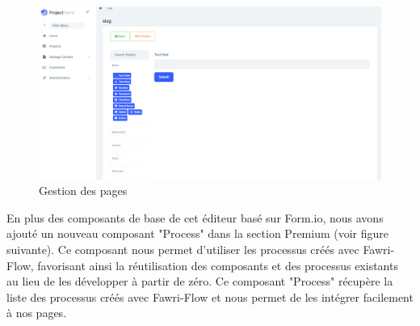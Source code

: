 \begin{enumerate}
\begin{figure}[H] 
    \centering
    \includegraphics[width=17cm]{Figures/manage page.PNG}
    \caption{Gestion des pages}
\end{figure}


En plus des composants de base de cet éditeur basé sur Form.io, nous avons ajouté un nouveau composant "Process" dans la section Premium (voir figure suivante). Ce composant nous permet d'utiliser les processus créés avec Fawri-Flow, favorisant ainsi la réutilisation des composants et des processus existants au lieu de les développer à partir de zéro. Ce composant "Process" récupère la liste des processus créés avec Fawri-Flow et nous permet de les intégrer facilement à nos pages.




\end{enumerate}
